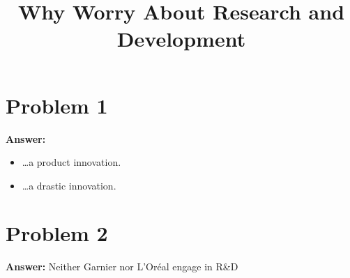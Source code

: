 \documentclass[11pt]{article}
\date{}
\title{Why Worry About Research and Development}
\begin{document}
\thispagestyle{empty}
\pagestyle{empty}
\section*{Problem 1}
\label{sec:orgd5e2ced}

\textbf{Answer:}
\begin{itemize}
\item \ldots{}a product innovation.
\item \ldots{}a drastic innovation.
\end{itemize}
\section*{Problem 2}
\label{sec:org98c4baa}

\textbf{Answer:} Neither Garnier nor L'Oréal engage in R\&D\\
\end{document}
